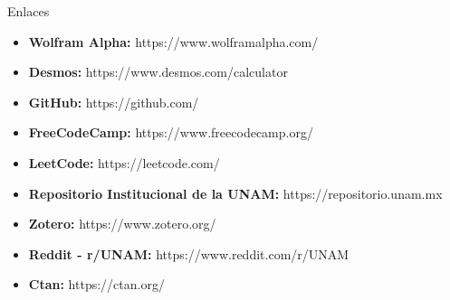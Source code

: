 \documentclass[11pt,letterpaper]{article}
\begin{document}
\begin{inciso}{Enlaces}
\begin{itemize}
    \item \textbf{Wolfram Alpha:} https://www.wolframalpha.com/
    \item \textbf{Desmos:} https://www.desmos.com/calculator
    \item \textbf{GitHub:} https://github.com/
    \item \textbf{FreeCodeCamp:} https://www.freecodecamp.org/
    \item \textbf{LeetCode:} https://leetcode.com/
    \item \textbf{Repositorio Institucional de la UNAM:} https://repositorio.unam.mx
    \item \textbf{Zotero:} https://www.zotero.org/
    \item \textbf{Reddit - r/UNAM:} https://www.reddit.com/r/UNAM
    \item \textbf{Ctan:} https://ctan.org/
\end{itemize}
\end{inciso}
\end{document}
